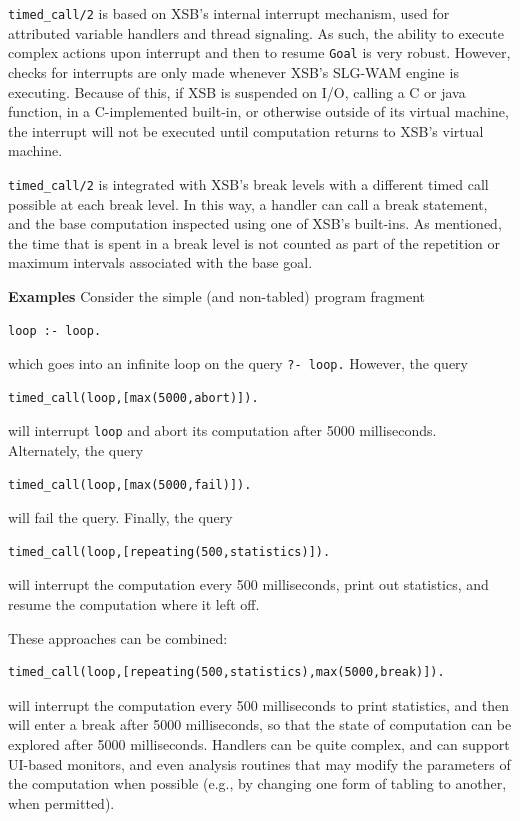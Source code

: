 \begin{description}
{\tt timed\_call/2} is based on XSB's internal interrupt mechanism,
used for attributed variable handlers and thread signaling.  As such,
the ability to execute complex actions upon interrupt and then to
resume {\tt Goal} is very robust.  However, checks for interrupts are
only made whenever XSB's SLG-WAM engine is executing.  Because of
this, if XSB is suspended on I/O, calling a C or java function, in a
C-implemented built-in, or otherwise outside of its virtual machine,
the interrupt will not be executed until computation returns to XSB's
virtual machine.

{\tt timed\_call/2} is integrated with XSB's break levels with a
different timed call possible at each break level.  In this way, a
handler can call a break statement, and the base computation inspected
using one of XSB's built-ins.  As mentioned, the time that is spent in
a break level is not counted as part of the repetition or maximum intervals associated with the base goal.


{\bf Examples}
Consider the simple (and non-tabled) program fragment
\begin{verbatim}
loop :- loop.
\end{verbatim}
which goes into an infinite loop on the query {\tt ?- loop.}  However,
the query
\begin{verbatim}
timed_call(loop,[max(5000,abort)]).
\end{verbatim}
will interrupt {\tt loop} and abort its computation after 5000
milliseconds.  Alternately, the query
\begin{verbatim}
timed_call(loop,[max(5000,fail)]).
\end{verbatim}
will fail the query.  Finally, the query
\begin{verbatim}
timed_call(loop,[repeating(500,statistics)]).
\end{verbatim}
will interrupt the computation every 500 milliseconds, print out
statistics, and resume the computation where it left off.

These approaches can be combined: 
\begin{verbatim}
timed_call(loop,[repeating(500,statistics),max(5000,break)]).
\end{verbatim}
will interrupt the computation every 500 milliseconds to print
statistics, and then will enter a break after 5000 milliseconds, so
that the state of computation can be explored after 5000 milliseconds.
Handlers can be quite complex, and can support UI-based monitors, and
even analysis routines that may modify the parameters of the
computation when possible (e.g., by changing one form of tabling to
another, when permitted).


\end{description}
